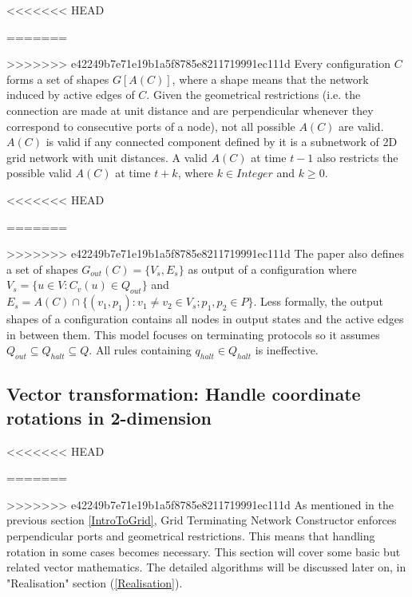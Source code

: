 <<<<<<< HEAD
\par\noindent
=======
\par
>>>>>>> e42249b7e71e19b1a5f8785e8211719991ec111d
Every configuration $C$ forms a set of shapes $G[A(C)]$, where a shape means that the network induced
by active edges of $C$. Given the geometrical restrictions (i.e. the connection are
made at unit distance and are perpendicular whenever they correspond to consecutive ports of a node),
not all possible $A(C)$ are valid. $A(C)$ is valid if any connected component defined by it is a
subnetwork of 2D grid network with unit distances. A valid $A(C)$ at time $t -1$ also restricts the
possible valid $A(C)$ at time $t + k$, where $k \in Integer$ and $k \geq 0 $.

<<<<<<< HEAD
\par\noindent
=======
\par
>>>>>>> e42249b7e71e19b1a5f8785e8211719991ec111d
The paper \cite{Mi17} also defines a set of
shapes $G_{out}(C) = \{V_{s}, E_{s}\}$ as output of a configuration where $V_{s} = \{u \in V : C_{v}(u) \in Q_{out} \}$
and $E_{s} = A(C) \cap \{ (v_{1}, p_{1}) : v_{1} \not= v_{2} \in V_{s}; p_{1}, p_{2} \in P \}$.
Less formally, the output shapes of a configuration contains all nodes in output states and the active edges in between them.
This model focuses on terminating protocols so it assumes $Q_{out} \subseteq Q_{halt} \subseteq Q $.
All rules containing $q_{halt} \in Q_{halt} $ is ineffective.

\subsection{Vector transformation: Handle coordinate rotations in 2-dimension}

<<<<<<< HEAD
\par\noindent
=======
\par
>>>>>>> e42249b7e71e19b1a5f8785e8211719991ec111d
As mentioned in the previous section \ref{IntroToGrid}, Grid Terminating Network Constructor enforces perpendicular ports
and geometrical restrictions. This means that handling rotation in some cases becomes necessary.
This section will cover some basic but related vector mathematics. The detailed algorithms will be discussed later on, in "Realisation" section (\ref{Realisation}).

